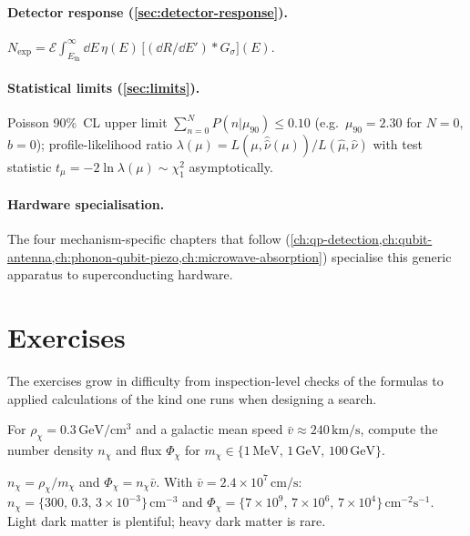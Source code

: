 \begin{chaptersummary}
\paragraph{Detector response (\cref{sec:detector-response}).}
$N_\text{exp}=\mathcal E\!\int_{E_\text{th}}^\infty\!\dd E\,\eta(E)\,
\bigl[(\dd R/\dd E')\!\ast\!G_\sigma\bigr](E)$.

\paragraph{Statistical limits (\cref{sec:limits}).}
Poisson 90\%~CL upper limit
$\sum_{n=0}^N P(n|\mu_{90})\leq 0.10$ (e.g.\ $\mu_{90}=2.30$ for
$N=0$, $b=0$); profile-likelihood ratio
$\lambda(\mu)=L(\mu,\hat{\hat\nu}(\mu))/L(\hat\mu,\hat\nu)$ with
test statistic $t_\mu=-2\ln\lambda(\mu)\sim\chi^2_1$ asymptotically.

\paragraph{Hardware specialisation.}
The four mechanism-specific chapters that follow
(\cref{ch:qp-detection,ch:qubit-antenna,ch:phonon-qubit-piezo,ch:microwave-absorption})
specialise this generic apparatus to superconducting hardware.

\end{chaptersummary}

\section*{Exercises}

The exercises grow in difficulty from inspection-level checks of
the formulas to applied calculations of the kind one runs when
designing a search.

\begin{exercise}
For $\rho_\chi=0.3\,\text{GeV}/\text{cm}^3$ and a galactic
mean speed $\bar v\approx 240\,\text{km}/\text{s}$, compute the
number density $n_\chi$ and flux $\Phi_\chi$ for
$m_\chi\in\{1\,\text{MeV},\,1\,\text{GeV},\,100\,\text{GeV}\}$.
\begin{solution}
$n_\chi=\rho_\chi/m_\chi$ and $\Phi_\chi=n_\chi\bar v$. With
$\bar v=2.4\times 10^7\,\text{cm}/\text{s}$:
$n_\chi=\{300,\,0.3,\,3\times 10^{-3}\}\,\text{cm}^{-3}$ and
$\Phi_\chi=\{7\times 10^9,\,7\times 10^6,\,7\times 10^4\}\,\text{cm}^{-2}\text{s}^{-1}$.
Light dark matter is plentiful; heavy dark matter is rare.
\end{solution}
\end{exercise}

